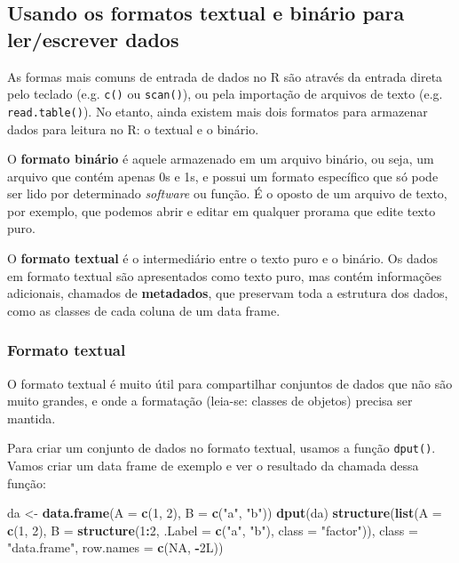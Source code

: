\documentclass[10pt,a4paper]{book}
\newenvironment{Shaded}{\begin{snugshade}}{\end{snugshade}}
\newcommand{\KeywordTok}[1]{\textcolor[rgb]{0.13,0.29,0.53}{\textbf{#1}}}
\newcommand{\DataTypeTok}[1]{\textcolor[rgb]{0.13,0.29,0.53}{#1}}
\newcommand{\DecValTok}[1]{\textcolor[rgb]{0.00,0.00,0.81}{#1}}
\newcommand{\StringTok}[1]{\textcolor[rgb]{0.31,0.60,0.02}{#1}}
\newcommand{\OtherTok}[1]{\textcolor[rgb]{0.56,0.35,0.01}{#1}}
\newcommand{\OperatorTok}[1]{\textcolor[rgb]{0.81,0.36,0.00}{\textbf{#1}}}
\newcommand{\NormalTok}[1]{#1}
\begin{document}
\subsection{Usando os formatos textual e binário para ler/escrever
dados}\label{usando-os-formatos-textual-e-binuxe1rio-para-lerescrever-dados}

As formas mais comuns de entrada de dados no R são através da entrada
direta pelo teclado (e.g. \texttt{c()} ou \texttt{scan()}), ou pela
importação de arquivos de texto (e.g. \texttt{read.table()}). No etanto,
ainda existem mais dois formatos para armazenar dados para leitura no R:
o textual e o binário.

O \textbf{formato binário} é aquele armazenado em um arquivo binário, ou
seja, um arquivo que contém apenas 0s e 1s, e possui um formato
específico que só pode ser lido por determinado \emph{software} ou
função. É o oposto de um arquivo de texto, por exemplo, que podemos
abrir e editar em qualquer prorama que edite texto puro.

O \textbf{formato textual} é o intermediário entre o texto puro e o
binário. Os dados em formato textual são apresentados como texto puro,
mas contém informações adicionais, chamados de \textbf{metadados}, que
preservam toda a estrutura dos dados, como as classes de cada coluna de
um data frame.

\subsubsection{Formato textual}\label{formato-textual}

O formato textual é muito útil para compartilhar conjuntos de dados que
não são muito grandes, e onde a formatação (leia-se: classes de objetos)
precisa ser mantida.

Para criar um conjunto de dados no formato textual, usamos a função
\texttt{dput()}. Vamos criar um data frame de exemplo e ver o resultado
da chamada dessa função:

\begin{Shaded}
\begin{Highlighting}[]
\NormalTok{da <-}\StringTok{ }\KeywordTok{data.frame}\NormalTok{(}\DataTypeTok{A =} \KeywordTok{c}\NormalTok{(}\DecValTok{1}\NormalTok{, }\DecValTok{2}\NormalTok{), }\DataTypeTok{B =} \KeywordTok{c}\NormalTok{(}\StringTok{"a"}\NormalTok{, }\StringTok{"b"}\NormalTok{))}
\KeywordTok{dput}\NormalTok{(da)}
\KeywordTok{structure}\NormalTok{(}\KeywordTok{list}\NormalTok{(}\DataTypeTok{A =} \KeywordTok{c}\NormalTok{(}\DecValTok{1}\NormalTok{, }\DecValTok{2}\NormalTok{), }\DataTypeTok{B =} \KeywordTok{structure}\NormalTok{(}\DecValTok{1}\OperatorTok{:}\DecValTok{2}\NormalTok{, }\DataTypeTok{.Label =} \KeywordTok{c}\NormalTok{(}\StringTok{"a"}\NormalTok{, }
\StringTok{"b"}\NormalTok{), }\DataTypeTok{class =} \StringTok{"factor"}\NormalTok{)), }\DataTypeTok{class =} \StringTok{"data.frame"}\NormalTok{, }\DataTypeTok{row.names =} \KeywordTok{c}\NormalTok{(}\OtherTok{NA}\NormalTok{, }
\OperatorTok{-}\NormalTok{2L))}
\end{Highlighting}
\end{Shaded}
\end{document}
